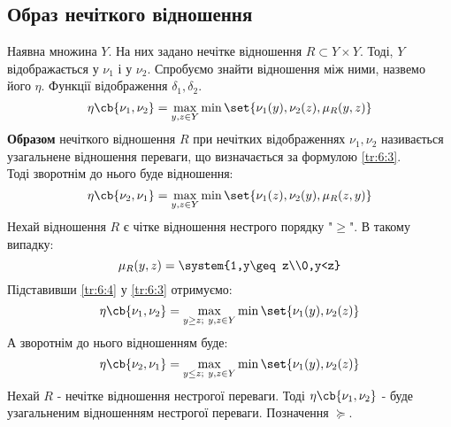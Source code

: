 \subsection{Образ нечіткого відношення}
Наявна множина $Y$. На них задано нечітке відношення $R\subset Y\times Y$. Тоді, $Y$ відображається у $\nu_1$ і у $\nu_2$. Спробуємо знайти відношення між ними, назвемо його $\eta$. Функції відображення $\delta_1,\delta_2$.\\
\begin{equation}\label{tr:6:3}
\eta\cb{\nu_1,\nu_2} = \max\limits_{y,z\in Y} \min\set{\nu_1(y),\nu_2(z),\mu_R(y,z)}
\end{equation}
\textbf{Образом} нечіткого відношення $R$ при нечітких відображеннях $\nu_1,\nu_2$ називається узагальнене відношення переваги, що визначається за формулою \eqref{tr:6:3}.\\
Тоді зворотнім до нього буде відношення:
\begin{equation}
\eta\cb{\nu_2,\nu_1} = \max\limits_{y,z\in Y} \min\set{\nu_1(z),\nu_2(y),\mu_R(z,y)}
\end{equation}
Нехай відношення $R$ є чітке відношення нестрого порядку "$\geq$". В такому випадку:
\begin{equation}\label{tr:6:4}
\mu_R(y,z) = \system{1,y\geq z\\0,y<z}
\end{equation}
Підставивши \eqref{tr:6:4} у \eqref{tr:6:3} отримуємо:
\begin{equation}
\eta\cb{\nu_1,\nu_2} = \max\limits_{y\geq z;~y,z\in Y}\min\set{\nu_1(y),\nu_2(z)}
\end{equation}
А зворотнім до нього відношенням буде:
\begin{equation}
\eta\cb{\nu_2,\nu_1} = \max\limits_{y\leq z;~y,z\in Y}\min\set{\nu_1(y),\nu_2(z)}
\end{equation}
Нехай $R$ - нечітке відношення нестрогої переваги. Тоді $\eta\cb{\nu_1,\nu_2}$ - буде узагальненим відношенням нестрогої переваги. Позначення $\succeq$.
